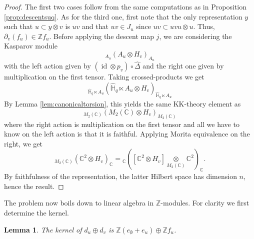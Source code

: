 \documentclass[a4paper, 11pt]{amsart}
\theoremstyle{plain}
\newtheorem{lem}[thm]{Lemma}
\theoremstyle{definition}
\theoremstyle{remark}
\DeclareMathOperator{\id}{id}
\newcommand{\C}{\mathbb{C}}
\newcommand{\D}{\Delta}
\newcommand{\HH}{\mathbb{H}}
\newcommand{\Z}{\mathbb{Z}}
\begin{document}
\begin{proof}
The first two cases follow from the same computations as in Proposition \ref{prop:descentsuq}. As for the third one, first note that the only representation $y$ such that $u\subset y\otimes v$ is $uv$ and that $uv\in J_{u}$ since $uv\subset uvu\otimes u$. Thus, $\partial_{v}(f_{u})\in \Z f_{u}$. Before applying the descent map $j$, we are considering the Kasparov module
\begin{equation*}
{}_{A_{u}}(A_{u}\otimes H_{v})_{A_{u}}
\end{equation*}
with the left action given by $(\id\otimes p_{v})\circ\widehat{\D}$ and the right one given by multiplication on the first tensor. Taking crossed-products we get
\begin{equation*}
{}_{\widehat{\HH}_{q}\ltimes A_{u}}(\widehat{\HH}_{q}\ltimes A_{u}\otimes H_{v})_{\widehat{\HH}_{q}\ltimes A_{u}}
\end{equation*}
By Lemma \ref{lem:canonicaltorsion}, this yields the same KK-theory element as
\begin{equation*}
{}_{M_{2}(\C)}(M_{2}(\C)\otimes H_{v})_{M_{2}(\C)}
\end{equation*}
where the right action is multiplication on the first tensor and all we have to know on the left action is that it is faithful. Applying Morita equivalence on the right, we get
\begin{equation*}
{}_{M_{2}(\C)}(\C^{2}\otimes H_{v})_{\C} = {}_{\C}([\C^{2}\otimes H_{v}] \underset{M_{2}(\C)}\otimes\C^{2})_{\C}.
\end{equation*}
By faithfulness of the representation, the latter Hilbert space has dimension $n$, hence the result.
\end{proof}

The problem now boils down to linear algebra in $\Z$-modules. For clarity we first determine the kernel.

\begin{lem}\label{lem:kernelsumorthogonal}
The kernel of $d_{u}\oplus d_{v}$ is $\Z(e_{\emptyset} + e_{u})\oplus\Z f_{u}$.
\end{lem}
\end{document}
